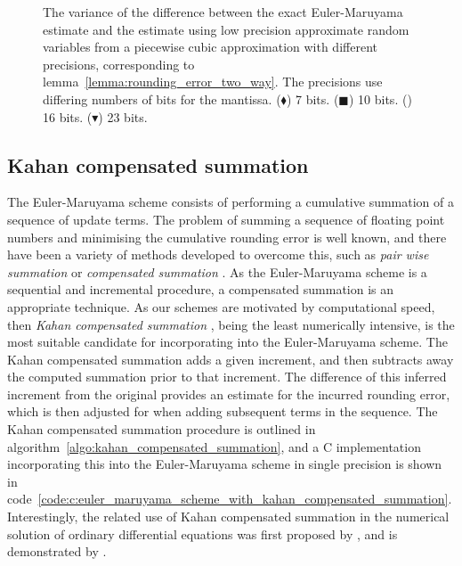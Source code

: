 \documentclass[9pt,a4paper,english]{extarticle}
\begin{document}
\begin{figure}[htb]
\centering
\hfil
{}\hfil 
{}\hfil

\caption{The variance of the difference between the exact Euler-Maruyama estimate and the estimate using low precision approximate random variables from a piecewise cubic approximation with different precisions, corresponding to lemma~\ref{lemma:rounding_error_two_way}. The precisions use differing numbers of bits for the mantissa. ($ \blacklozenge $) 7 bits. ($ \blacksquare $) 10 bits. (\raisebox{-0.1em}{\huge$ \bullet$})
16 bits. ({\large $ \blacktriangledown $}) 23 bits.}
\label{fig:two_way_variances}
\end{figure}

\subsection{Kahan compensated summation}
\label{sec:kahan_compensated_summation}

The Euler-Maruyama scheme consists of performing a cumulative summation of a sequence of update terms. The problem of summing a sequence of floating point numbers and minimising the cumulative rounding error is well known, and there have been a variety of methods developed to overcome this, such as \emph{pair wise summation} or \emph{compensated summation} \citep[4.1]{higham2002accuracy}. As the Euler-Maruyama scheme is a sequential and incremental procedure, a compensated summation is an appropriate technique. As our schemes are motivated by computational speed, then \emph{Kahan compensated summation} \citep{kahan1965further}, being the least numerically intensive, is the most suitable candidate for incorporating into the Euler-Maruyama scheme. The Kahan compensated summation adds a given increment, and then subtracts away the computed summation prior to that increment. The difference of this inferred increment from the original provides an estimate for the incurred rounding error, which is then adjusted for when adding subsequent terms in the sequence. The Kahan compensated summation procedure is outlined in algorithm~\ref{algo:kahan_compensated_summation}, and a C implementation incorporating this into the Euler-Maruyama scheme in single precision is shown in code~\ref{code:c:euler_maruyama_scheme_with_kahan_compensated_summation}. Interestingly, the related use of Kahan compensated summation in the numerical solution of ordinary differential equations was first proposed by \citet{vitasek1969numerical}, and is demonstrated by \citet[pages~86--87]{higham1993accuracy}.
\end{document}
